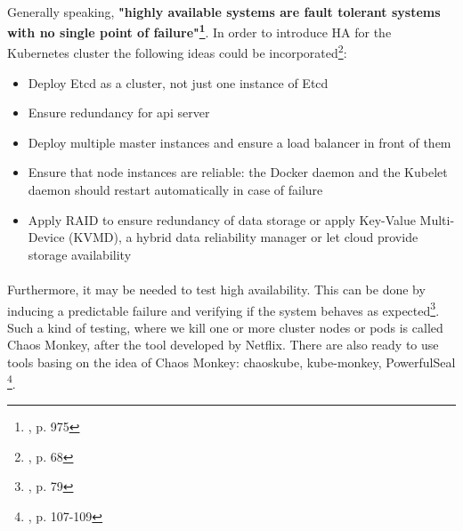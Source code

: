 \paragraph{}
Generally speaking, \textbf{"highly available systems are fault tolerant systems with no single point of failure"\footnote{\cite{article-redundancy-models}, p. 975}}. In order to introduce HA for the Kubernetes cluster the following ideas could be incorporated\footnote{\cite{book-mastering-k8s}, p. 68}:
\begin{itemize}
\item Deploy Etcd as a cluster, not just one instance of Etcd
\item Ensure redundancy for api server
\item Deploy multiple master instances and ensure a load balancer in front of them
\item Ensure that node instances are reliable: the Docker daemon and the Kubelet daemon should restart automatically in case of failure
\item Apply RAID to ensure redundancy of data storage or apply Key-Value Multi-Device (KVMD), a hybrid data reliability manager\cite{data-rel-kv} or let cloud provide storage availability
\end{itemize}

\paragraph{}
Furthermore, it may be needed to test high availability. This can be done by inducing a predictable failure and verifying if the system behaves as expected\footnote{\cite{book-mastering-k8s}, p. 79}. Such a kind of testing, where we kill one or more cluster nodes or pods is called Chaos Monkey, after the tool developed by Netflix. There are also ready to use tools basing on the idea of Chaos Monkey: chaoskube, kube-monkey, PowerfulSeal \footnote{\cite{book-cndwk}, p. 107-109}.

